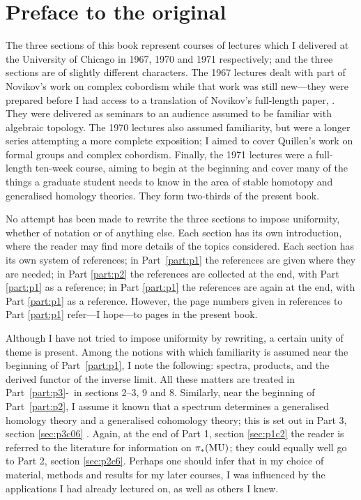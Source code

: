 \documentclass[main]{subfiles}
\begin{document}
\chapter*{Preface to the original}
The three sections of this book represent courses of lectures which I delivered at the University of Chicago in 1967, 1970 and 1971 respectively; and the three sections are of slightly different characters.
The 1967 lectures dealt with part of Novikov's work on complex cobordism while that work was still new---they were prepared before I had access to a translation of Novikov's full-length paper, \cite{novikov3}. 
They were delivered as seminars to an audience assumed to be familiar with algebraic topology. 
The 1970 lectures also assumed familiarity, but were a longer series attempting a more complete exposition; I aimed to cover Quillen's work on formal groups and complex cobordism.
Finally, the 1971 lectures were a full-length ten-week course, aiming to begin at the beginning and cover many of the things a graduate student needs to know in the area of stable homotopy and generalised homology theories.
They form two-thirds of the present book.

No attempt has been made to rewrite the three sections to impose uniformity, whether of notation or of anything else. 
Each section has its own introduction, where the reader may find more details of the topics considered. 
Each section has its own system of references; in Part~\ref{part:p1} the
references are given where they are needed; in Part \ref{part:p2} the references are collected at the end, with Part \ref{part:p1} as a reference; in Part \ref{part:p1} the references are again at the end, with Part \ref{part:p1} as a reference. 
However, the page numbers given in references to Part \ref{part:p1} refer---I hope---to pages in the present book.

Although I have not tried to impose uniformity by rewriting, a certain unity of theme is present. 
Among the notions with which familiarity is assumed near the beginning of Part~\ref{part:p1}, I note the following: spectra, products, and the derived functor of the inverse limit. 
All these matters are treated in Part~\ref{part:p3}-~in sections 2--3, 9 and 8. Similarly, near the beginning of Part~\ref{part:p2}, I assume it known that a spectrum determines a generalised homology theory and a generalised cohomology theory; this is set out in Part 3, section \ref{sec:p3c06} . 
Again, at the end of Part 1, section \ref{sec:p1c2}  the reader is referred to the literature for information on $\pi_{*} (\mathrm{MU})$; they could equally well go to Part 2, section \ref{sec:p2c6}. Perhaps one should infer that in my choice of material, methods and results for my later courses, I was influenced by the applications I had already lectured on, as well as others I knew.
\end{document}
